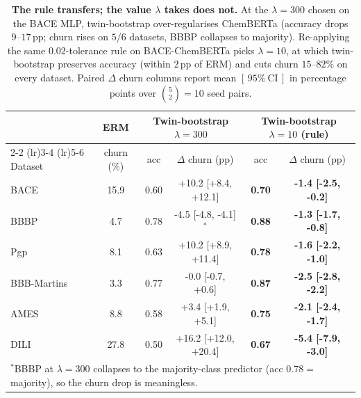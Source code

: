 \begin{table}[h]
\centering
\caption{\textbf{\boldmath The rule transfers; the value $\lambda$ takes does not.}  At the $\lambda{=}300$ chosen on the BACE MLP, twin-bootstrap over-regularises ChemBERTa (accuracy drops $9\text{--}17$\,pp; churn rises on $5/6$ datasets, BBBP collapses to majority).  Re-applying the same $0.02$-tolerance rule on BACE-ChemBERTa picks $\lambda{=}10$, at which twin-bootstrap preserves accuracy (within $2$\,pp of ERM) and cuts churn $15\text{--}82\%$ on every dataset.  Paired $\Delta$ churn columns report mean $[\,95\%\ \text{CI}\,]$ in percentage points over $\binom{5}{2}{=}10$ seed pairs.}
\label{tab:chemberta}
\small
\begin{tabular}{lc@{\hspace{0.8em}}cc@{\hspace{0.8em}}cc}
\toprule
 & \multicolumn{1}{c}{ERM} & \multicolumn{2}{c}{Twin-bootstrap $\lambda{=}300$} & \multicolumn{2}{c}{Twin-bootstrap $\lambda{=}10$ (rule)} \\
\cmidrule(lr){2-2} \cmidrule(lr){3-4} \cmidrule(lr){5-6}
Dataset & churn (\%) & acc & $\Delta$ churn (pp) & acc & $\Delta$ churn (pp) \\
\midrule
    BACE & 15.9 & 0.60 & +10.2 [+8.4, +12.1] & \textbf{0.70} & \textbf{-1.4 [-2.5, -0.2]} \\
    BBBP & 4.7 & 0.78 & -4.5 [-4.8, -4.1]$^{*}$ & \textbf{0.88} & \textbf{-1.3 [-1.7, -0.8]} \\
    Pgp & 8.1 & 0.63 & +10.2 [+8.9, +11.4] & \textbf{0.78} & \textbf{-1.6 [-2.2, -1.0]} \\
    BBB-Martins & 3.3 & 0.77 & -0.0 [-0.7, +0.6] & \textbf{0.87} & \textbf{-2.5 [-2.8, -2.2]} \\
    AMES & 8.8 & 0.58 & +3.4 [+1.9, +5.1] & \textbf{0.75} & \textbf{-2.1 [-2.4, -1.7]} \\
    DILI & 27.8 & 0.50 & +16.2 [+12.0, +20.4] & \textbf{0.67} & \textbf{-5.4 [-7.9, -3.0]} \\
\bottomrule
\multicolumn{6}{l}{\footnotesize $^{*}$BBBP at $\lambda{=}300$ collapses to the majority-class predictor (acc $0.78{=}$ majority), so the churn drop is meaningless.}
\end{tabular}
\end{table}
